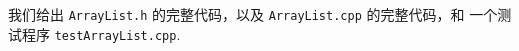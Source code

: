 \documentclass[a4paper]{ctexart}
\theoremstyle{definition}
\theoremstyle{definition}
\begin{document}


    



我们给出 \verb|ArrayList.h| 的完整代码，以及 \verb|ArrayList.cpp| 的完整代码，和 一个测试程序 \verb|testArrayList.cpp|.
\end{document}
